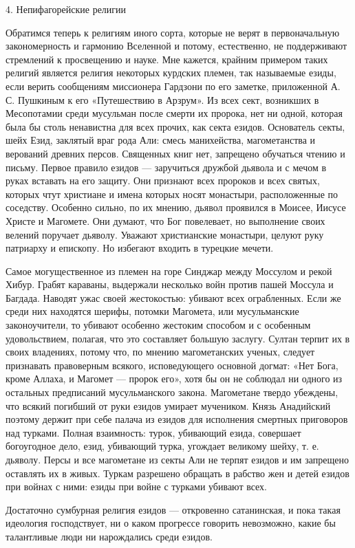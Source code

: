 4. Непифагорейские религии

Обратимся теперь к религиям иного сорта, которые не верят в первоначальную
закономерность и гармонию Вселенной и потому, естественно, не поддерживают
стремлений к просвещению и науке. Мне кажется, крайним примером таких религий
является религия некоторых курдских племен, так называемые езиды, если верить
сообщениям миссионера Гардзони по его заметке, приложенной А. С. Пушкиным к его
«Путешествию в Арзрум». Из всех сект, возникших в Месопотамии среди мусульман
после смерти их пророка, нет ни одной, которая была бы столь ненавистна для
всех прочих, как секта езидов. Основатель секты, шейх Езид, заклятый враг рода
Али: смесь манихейства, магометанства и верований древних персов. Священных
книг нет, запрещено обучаться чтению и письму. Первое правило езидов ---
заручиться дружбой дьявола и с мечом в руках вставать на его защиту. Они
признают всех пророков и всех святых, которых чтут христиане и имена которых
носят монастыри, расположенные по соседству. Особенно сильно, по их мнению,
дьявол проявился в Моисее, Иисусе Христе и Магомете. Они думают, что Бог
повелевает, но выполнение своих велений поручает дьяволу. Уважают христианские
монастыри, целуют руку патриарху и епископу. Но избегают входить в турецкие
мечети.

Самое могущественное из племен на горе Синджар между Моссулом и рекой Хибур.
Грабят караваны, выдержали несколько войн против пашей Моссула и Багдада.
Наводят ужас своей жестокостью: убивают всех ограбленных. Если же среди них
находятся шерифы, потомки Магомета, или мусульманские законоучители, то убивают
особенно жестоким способом и с особенным удовольствием, полагая, что это
составляет большую заслугу. Султан терпит их в своих владениях,
потому что, по мнению магометанских ученых, следует признавать правоверным
всякого, исповедующего основной догмат: «Нет Бога, кроме Аллаха, и Магомет ---
пророк его», хотя бы он не соблюдал ни одного из остальных предписаний
мусульманского закона. Магометане твердо убеждены, что всякий погибший от руки
езидов умирает мучеником. Князь Анадийский поэтому держит при себе палача из
езидов для исполнения смертных приговоров над турками. Полная взаимность:
турок, убивающий езида, совершает богоугодное дело, езид, убивающий турка,
угождает великому шейху, т. е. дьяволу. Персы и все магометане из секты Али не
терпят езидов и им запрещено оставлять их в живых. Туркам разрешено обращать в
рабство жен и детей езидов при войнах с ними: езиды при войне с турками убивают
всех.

Достаточно сумбурная религия езидов --- откровенно сатанинская, и пока такая
идеология господствует, ни о каком прогрессе говорить невозможно, какие бы
талантливые люди ни нарождались среди езидов.

